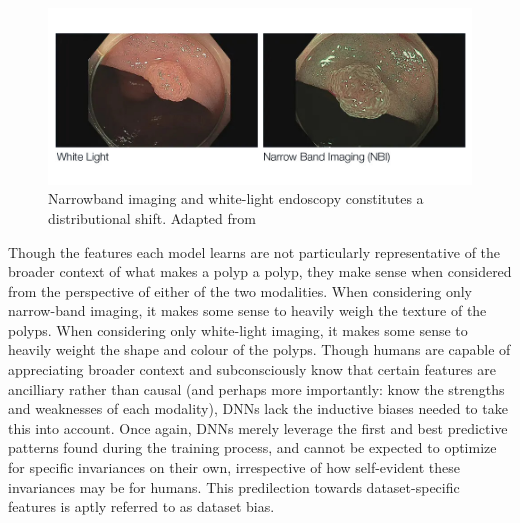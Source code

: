 	\begin{figure}[ht]
		\includegraphics[width=\linewidth]{illustrations/narrow_band.jpg}
		\caption{Narrowband imaging and white-light endoscopy constitutes a distributional shift. Adapted from ~\cite{nbi_img}}
		\label{imaging_modalities}
	\end{figure}

	Though the features each model learns are not particularly representative of the broader context of what makes a polyp a polyp, they make sense when considered from the perspective of either of the two modalities. When considering only narrow-band imaging, it makes some sense to heavily weigh the texture of the polyps. When considering only white-light imaging, it makes some sense to heavily weight the shape and colour of the polyps. Though humans are capable of appreciating broader context and subconsciously know that certain features are ancilliary rather than causal (and perhaps more importantly: know the strengths and weaknesses of each modality), DNNs lack the inductive biases needed to take this into account. Once again, DNNs merely leverage the first and best predictive patterns found during the training process, and cannot be expected to optimize for specific invariances on their own, irrespective of how self-evident these invariances may be for humans. This predilection towards dataset-specific features is aptly referred to as dataset bias. 
	
